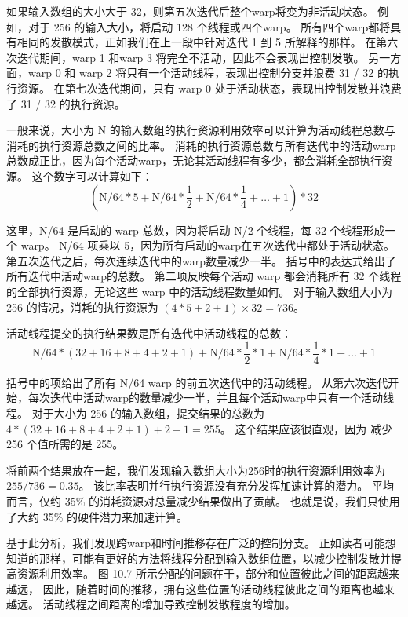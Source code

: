 如果输入数组的大小大于 32，则第五次迭代后整个warp将变为非活动状态。 
例如，对于 256 的输入大小，将启动 128 个线程或四个warp。 
所有四个warp都将具有相同的发散模式，正如我们在上一段中针对迭代 1 到 5 所解释的那样。
在第六次迭代期间，warp 1 和warp 3 将完全不活动，因此不会表现出控制发散。 
另一方面，warp 0 和 warp 2 将只有一个活动线程，表现出控制分支并浪费 31 / 32 的执行资源。 
在第七次迭代期间，只有 warp 0 处于活动状态，表现出控制发散并浪费了 31 / 32 的执行资源。

一般来说，大小为 N 的输入数组的执行资源利用效率可以计算为活动线程总数与消耗的执行资源总数之间的比率。 
消耗的执行资源总数与所有迭代中的活动warp总数成正比，因为每个活动warp，无论其活动线程有多少，都会消耗全部执行资源。 
这个数字可以计算如下：
$$
\left(\mathrm{N} / 64 * 5+\mathrm{N} / 64 * \frac{1}{2} +\mathrm{N} / 64*\frac{1}{4} +\ldots+1\right) * 32
$$

这里，N/64 是启动的 warp 总数，因为将启动 N/2 个线程，每 32 个线程形成一个 warp。 
N/64 项乘以 5，因为所有启动的warp在五次迭代中都处于活动状态。 第五次迭代之后，每次连续迭代中的warp数量减少一半。 
括号中的表达式给出了所有迭代中活动warp的总数。 
第二项反映每个活动 warp 都会消耗所有 32 个线程的全部执行资源，无论这些 warp 中的活动线程数量如何。 
对于输入数组大小为 256 的情况，消耗的执行资源为 $(4 * 5+2+1) × 32 = 736$。

活动线程提交的执行结果数是所有迭代中活动线程的总数：
$$
\mathrm{N} / 64 * (32+16+8+4+2+1)+\mathrm{N} / 64*\frac{1}{2} * 1+\mathrm{N} / 64* \frac{1}{4}* 1+\ldots+1
$$

括号中的项给出了所有 N/64 warp 的前五次迭代中的活动线程。 
从第六次迭代开始，每次迭代中活动warp的数量减少一半，并且每个活动warp中只有一个活动线程。 
对于大小为 256 的输入数组，提交结果的总数为 $4*(32+16+8+4+2+1)+2+1 = 255$。
这个结果应该很直观，因为 减少 256 个值所需的是 255。

将前两个结果放在一起，我们发现输入数组大小为256时的执行资源利用效率为 $255/736 = 0.35$。 
该比率表明并行执行资源没有充分发挥加速计算的潜力。 平均而言，仅约 35\% 的消耗资源对总量减少结果做出了贡献。 
也就是说，我们只使用了大约 35\% 的硬件潜力来加速计算。

基于此分析，我们发现跨warp和时间推移存在广泛的控制分支。 
正如读者可能想知道的那样，可能有更好的方法将线程分配到输入数组位置，以减少控制发散并提高资源利用效率。 
图 10.7 所示分配的问题在于，部分和位置彼此之间的距离越来越远，
因此，随着时间的推移，拥有这些位置的活动线程彼此之间的距离也越来越远。 活动线程之间距离的增加导致控制发散程度的增加。

